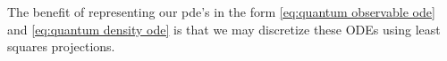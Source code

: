 \documentclass[final,leqno]{siamltex1213}
\begin{document}
The benefit of representing our pde's in the form \eqref{eq:quantum observable ode} and \eqref{eq:quantum density ode}
is that we may discretize these ODEs using least squares projections.

%
%
\end{document}
